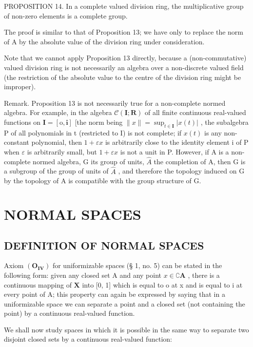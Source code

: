 PROPOSITION 14. In a complete valued division ring, the multiplicative group of non-zero elements is a complete group.

The proof is similar to that of Proposition 13; we have only to replace the norm of A by the absolute value of the division ring under consideration.

Note that we cannot apply Proposition 13 directly, because a (non-commutative) valued division ring is not necessarily an algebra over a non-discrete valued field (the restriction of the absolute value to the centre of the division ring might be improper).

Remark. Proposition 13 is not necessarily true for a non-complete normed algebra. For example, in the algebra \(\mathcal{C}(\mathbf{I};\mathbf{R})\) of all finite continuous real-valued functions on \(\mathbf{I} = [\mathrm{o},\mathbf{i}]\) {[}the norm being \(\| x\| = \sup_{t\in \mathbf{I}}|x(t)|\) , the subalgebra P of all polynomials in t (restricted to I) is not complete; if \(x(t)\) is any non-constant polynomial, then \(1 + \varepsilon x\) is arbitrarily close to the identity element i of P when \(\varepsilon\) is arbitrarily small, but \(1 + \varepsilon x\) is not a unit in P. However, if A is a non-complete normed algebra, G its group of units, \(\hat{A}\) the completion of A, then G is a subgroup of the group of units of \(\hat{A}\) , and therefore the topology induced on G by the topology of A is compatible with the group structure of G.

\section{NORMAL SPACES}

\subsection{DEFINITION OF NORMAL SPACES}

Axiom \((\mathbf{O}_{\mathbf{IV}})\) for uniformizable spaces (§ 1, no. 5) can be stated in the following form: given any closed set A and any point \(x \in \complement \mathbf{A}\) , there is a continuous mapping of \(\mathbf{X}\) into {[}0, 1{]} which is equal to o at x and is equal to i at every point of A; this property can again be expressed by saying that in a uniformizable space we can separate a point and a closed set (not containing the point) by a continuous real-valued function.

We shall now study spaces in which it is possible in the same way to separate two disjoint closed sets by a continuous real-valued function:

